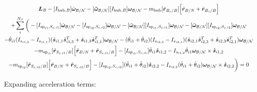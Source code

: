 \documentclass[paper]{aiaaNew}
\begin{document}
\begin{multline}
\bm L_B -[I_{\text{hub},B}] \dot{\bm\omega}_{\cal B/N}  -[\bm{\tilde{\omega}}_{\cal B/N}] [I_{\text{hub},B}] \bm\omega_{\cal B/N} - m_{\text{hub}} [\tilde{{\bm r}}_{B_c/B}] \Big[\ddot{\bm r}_{B/N} + \ddot{\bm r}_{B_c/B}\Big] \\
+ \sum\limits_{i}^{N_S}\bigg(-[I_{\text{sp}_{i1},S_{c,i1}}] \dot{\bm \omega}_{\cal{B/N}} -[I_{\text{sp}_{i2},S_{c,i2}}] \dot{\bm \omega}_{\cal{B/N}} -[\tilde{\bm \omega}_{\cal{B/N}}] [I_{\text{sp}_{i1},S_{c,i1}}] \bm \omega_{\cal{B/N}}-[\tilde{\bm \omega}_{\cal{B/N}}] [I_{\text{sp}_{i2},S_{c,i2}}] \bm \omega_{\cal{B/N}}\\
-\dot{\theta}_{i1} (I_{s_{i1,3}} - I_{s_{i1,1}})( \hat{\bm s}_{i1,1} \hat{\bm s}_{i1,3}^T + \hat{\bm s}_{i1,3} \hat{\bm s}_{i1,1}^T) \bm \omega_{\cal{B/N}} -(\dot{\theta}_{i1}  + \dot{\theta}_{i2})(I_{s_{i2,3}} - I_{s_{i2,1}}) (\hat{\bm s}_{i2,1} \hat{\bm s}_{i2,3}^T + \hat{\bm s}_{i2,3} \hat{\bm s}_{i2,1}^T) \bm \omega_{\cal{B/N}} \\
- m_{\text{sp}_{i1}} [\tilde{{\bm r}}_{S_{c,i1}/B}] \Big[\ddot{\bm r}_{B/N} + \ddot{\bm r}_{S_{c,i1}/B}\Big]
 -[I_{\text{sp}_{i1},S_{c,i1}}] \ddot{\theta}_{i1} \hat{\bm s}_{i1,2} 
-I_{s_{i1,2}} \dot{\theta}_{i1} \bm \omega_{\cal{B/N}} \times \hat{\bm s}_{i1,2}\\
- m_{\text{sp}_{i2}} [\tilde{{\bm r}}_{S_{c,i2}/B}] \Big[\ddot{\bm r}_{B/N} + \ddot{\bm r}_{S_{c,i2}/B}\Big]
 -[I_{\text{sp}_{i2},S_{c,i2}}] (\ddot{\theta}_{i1}  + \ddot{\theta}_{i2})\hat{\bm s}_{i2,2} 
-I_{s_{i2,2}}  (\dot{\theta}_{i1}  + \dot{\theta}_{i2}) \bm \omega_{\cal{B/N}} \times \hat{\bm s}_{i2,2} \bigg) = 0
\end{multline}

Expanding acceleration terms:
\end{document}
